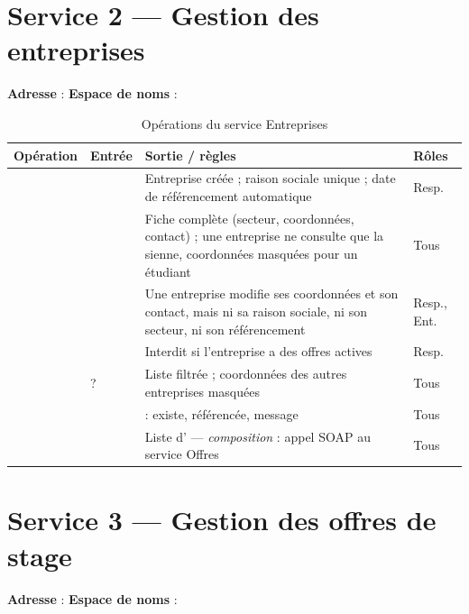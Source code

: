 \section{Service 2 — Gestion des entreprises}
\textbf{Adresse} :  \quad \textbf{Espace de noms} : 

\begin{table}[htbp]
\centering\small
\caption{Opérations du service Entreprises}
\begin{tabularx}{\textwidth}{@{}lYYl@{}}
\toprule
\textbf{Opération} & \textbf{Entrée} & \textbf{Sortie / règles} & \textbf{Rôles} \\
\midrule
{} &  & Entreprise créée ; raison sociale unique ; date de référencement automatique & Resp. \\
 &  & Fiche complète (secteur, coordonnées, contact) ; une entreprise ne consulte que la sienne, coordonnées masquées pour un étudiant & Tous \\
 &  & Une entreprise modifie ses coordonnées et son contact, mais ni sa raison sociale, ni son secteur, ni son référencement & Resp., Ent. \\
 &  & Interdit si l'entreprise a des offres actives & Resp. \\
 & ? & Liste filtrée ; coordonnées des autres entreprises masquées & Tous \\
 &  &  : existe, référencée, message & Tous \\
 &  & Liste d' — \emph{composition} : appel SOAP au service Offres & Tous \\
\bottomrule
\end{tabularx}
\end{table}

\section{Service 3 — Gestion des offres de stage}
\textbf{Adresse} :  \quad \textbf{Espace de noms} : 

